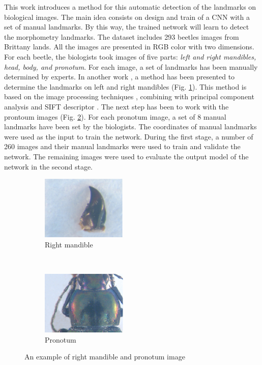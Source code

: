\documentclass[conference]{IEEEtran}
\begin{document}
This work introduces a method for this automatic detection of the landmarks on biological images. The main idea consists on design and train of a CNN \cite{lecun2010convolutional} with a set of manual landmarks. By this way, the trained network will learn to detect the morphometry landmarks. The dataset includes 293 beetles images from Brittany lands. All the images are presented in RGB color with two dimensions. For each beetle, the biologists took images of five parts: \textit{left and right mandibles, head, body, and pronotum}. For each image, a set of landmarks has been manually determined by experts. In another work \cite{le2017maelab}, a method has been presented to determine the landmarks on left and right mandibles (Fig. \ref{figsub01}). This method is based on the image processing techniques \cite{canny1986computational}, combining with principal component analysis \cite{shlens2014tutorial} and SIFT descriptor \cite{lowe2004distinctive}. The next step has been to work with the prontoum images (Fig. \ref{figsub02}). For each pronotum image, a set of 8 manual landmarks have been set by the biologists. The coordinates of manual landmarks were used as the input to train the network. During the first stage, a number of 260 images and their manual landmarks were used to train and validate the network. The remaining images were used to evaluate the output model of the network in the second stage.

\begin{figure}[htbp]
    \centering
    \begin{subfigure}[t]{0.25\textwidth}
        \centering
        \includegraphics[height=1.2in]{images/md19.eps}
        \caption{Right mandible}
        \label{figsub01}
    \end{subfigure}%
    ~ 
    \begin{subfigure}[t]{0.25\textwidth}
        \centering
        \includegraphics[height=1.2in]{images/prono60.eps}
        \caption{Pronotum }
        \label{figsub02}
    \end{subfigure}
    \caption{An example of right mandible and pronotum image}
    \label{figsub012}
\end{figure}
\end{document}
